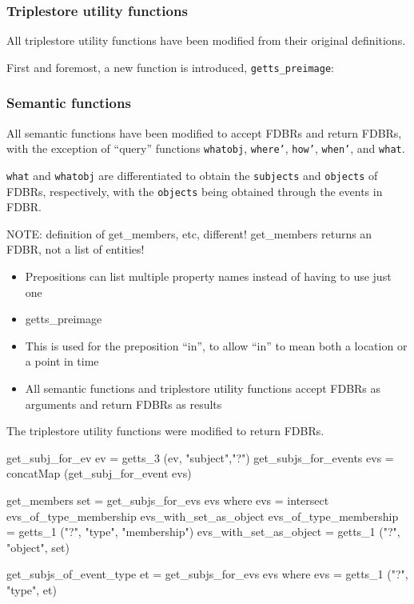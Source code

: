 \documentclass[../main.tex]{subfiles}
\begin{document}
\subsubsection{Triplestore utility functions}

All triplestore utility functions have been modified from their original definitions.

First and foremost, a new function is introduced, \texttt{getts\_preimage}:





\subsubsection{Semantic functions}

All semantic functions have been modified to accept FDBRs and return FDBRs, with the exception of ``query'' functions
\texttt{whatobj}, \texttt{where'}, \texttt{how'}, \texttt{when'}, and \texttt{what}.

\texttt{what} and \texttt{whatobj} are differentiated to obtain the \texttt{subjects} and \texttt{objects} of FDBRs, respectively, with the
\texttt{objects} being obtained through the events in FDBR. 




NOTE: definition of get\_members, etc, different! get\_members returns an FDBR, not a list of entities!

\begin{itemize}
	\item Prepositions can list multiple property names instead of having to use just one
	\item getts\_preimage
	\item This is used for the preposition ``in'', to allow ``in'' to mean both a location or a point in time
	\item All semantic functions and triplestore utility functions accept FDBRs as arguments and return FDBRs as results
\end{itemize}

The triplestore utility functions were modified to return FDBRs.

\begin{code}
	get_subj_for_ev ev       = getts_3 (ev,  "subject","?")
	get_subjs_for_events evs = concatMap (get_subj_for_event evs)
	
	get_members set = get_subjs_for_evs evs
		where
			evs = intersect evs_of_type_membership evs_with_set_as_object
			evs_of_type_membership   = getts_1 ("?", "type", "membership")
			evs_with_set_as_object   = getts_1 ("?",  "object",  set)
	
	get_subjs_of_event_type et  = get_subjs_for_evs evs
		where
			evs = getts_1 ("?",  "type",  et)
\end{code}
\end{document}
